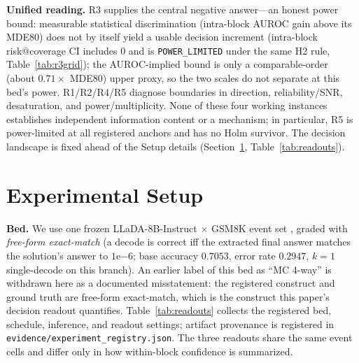\documentclass{article}
\begin{document}
\textbf{Unified reading.} R3 supplies the central negative answer---an honest power bound:
measurable statistical discrimination (intra-block AUROC gain above its MDE80) does not by
itself yield a usable decision increment (intra-block risk@coverage CI includes 0 and is
\texttt{POWER\_LIMITED} under the same H2 rule, Table~\ref{tab:r3grid}); the AUROC-implied bound is only a
comparable-order (about $0.71\times$ MDE80) upper proxy, so the two scales do not separate
at this bed's power. R1/R2/R4/R5
diagnose
boundaries in direction, reliability/SNR, desaturation, and power/multiplicity. None of
these four working instances establishes independent information content or a mechanism;
in particular, R5 is power-limited at all registered anchors and has no Holm survivor. The
decision landscape is fixed ahead of the Setup details (Section~\ref{sec:setup},
Table~\ref{tab:readouts}).

\section{Experimental Setup}
\label{sec:setup}

\textbf{Bed.} We use one frozen LLaDA-8B-Instruct $\times$ GSM8K event set
\cite{cobbe2021training}, graded with \emph{free-form exact-match} (a decode is correct iff
the extracted final answer matches the solution's answer to $1\mathrm{e}{-6}$; base
accuracy $0.7053$, error rate $0.2947$, $k{=}1$ single-decode on this branch). An earlier
label of this bed as ``MC 4-way'' is withdrawn here as a documented misstatement: the
registered construct and ground truth are free-form exact-match, which is the construct this
paper's decision readout quantifies. Table~\ref{tab:readouts} collects the registered bed,
schedule, inference, and readout settings; artifact provenance is registered in
\texttt{evidence/experiment\_registry.json}. The three readouts share the same event cells
and differ only in how within-block confidence is summarized.
\end{document}
